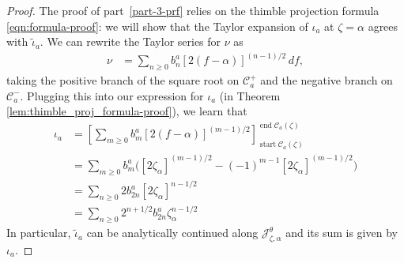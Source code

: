 \documentclass{article}
\newcommand{\series}[1]{\tilde{#1}}
\theoremstyle{definition}
\theoremstyle{plain}
\begin{document}
\begin{proof}
The proof of part~\ref{part-3-prf} relies on the thimble projection formula \eqref{eqn:formula-proof}: we will show that the Taylor expansion of $\iota_a$ at $\zeta=\alpha$ agrees with $\series{\iota}_a$. We can rewrite the Taylor series for $\nu$ as
\begin{align*}
\nu & = \sum_{n \ge 0} b_n^a [2(f - \alpha)]^{(n - 1)/2}\,df,
\end{align*}
taking the positive branch of the square root on $\mathcal{C}^+_a$ and the negative branch on $\mathcal{C}^-_a$. Plugging this into our expression for $\iota_a$ (in Theorem \ref{lem:thimble_proj_formula-proof}), we learn that
\begin{align*}
\iota_a & = \left[ \sum_{m \ge 0} b_m^a [2(f - \alpha)]^{(m - 1)/2} \right]_{\operatorname{start} \mathcal{C}_a(\zeta)}^{\operatorname{end} \mathcal{C}_a(\zeta)} \\
& = \sum_{m \ge 0} b_m^a \Big( [2\zeta_\alpha]^{(m - 1)/2} - (-1)^{m-1}[2\zeta_\alpha]^{(m - 1)/2} \Big) \\
& = \sum_{n \ge 0} 2 b_{2n}^a [2\zeta_\alpha]^{n - 1/2} \\
& = \sum_{n \ge 0} 2^{n+1/2} b_{2n}^a \zeta_\alpha^{n - 1/2}
\end{align*}
In particular, $\series{\iota}_a$ can be analytically continued along $\mathcal{J}_{\zeta,\alpha}^\theta$ and its sum is given by $\iota_a$.
\end{proof}
\end{document}
